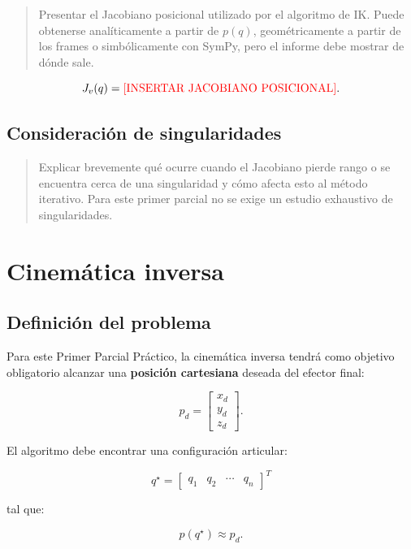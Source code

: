 \documentclass[journal]{IEEEtran}
\newcommand{\instr}[1]{%
\begin{quote}
\small
\noindent\textbf{\color{blue}{INSTRUCCIÓN:}} #1
\end{quote}
}
\begin{document}
\instr{Presentar el Jacobiano posicional utilizado por el algoritmo de IK. Puede obtenerse analíticamente a partir de $p(q)$, geométricamente a partir de los frames o simbólicamente con SymPy, pero el informe debe mostrar de dónde sale.}

\begin{equation}
J_v(q)=\textcolor{red}{\text{[INSERTAR JACOBIANO POSICIONAL]}}.
\end{equation}

\subsection{Consideración de singularidades}

\instr{Explicar brevemente qué ocurre cuando el Jacobiano pierde rango o se encuentra cerca de una singularidad y cómo afecta esto al método iterativo. Para este primer parcial no se exige un estudio exhaustivo de singularidades.}

\section{Cinemática inversa}

\subsection{Definición del problema}

Para este Primer Parcial Práctico, la cinemática inversa tendrá como objetivo obligatorio alcanzar una \textbf{posición cartesiana} deseada del efector final:

\begin{equation}
p_d =
\begin{bmatrix}
x_d\\
y_d\\
z_d
\end{bmatrix}.
\end{equation}

El algoritmo debe encontrar una configuración articular:

\begin{equation}
q^\star =
\begin{bmatrix}
q_1 & q_2 & \cdots & q_n
\end{bmatrix}^{T}
\end{equation}

tal que:

\begin{equation}
p(q^\star) \approx p_d.
\end{equation}
\end{document}
